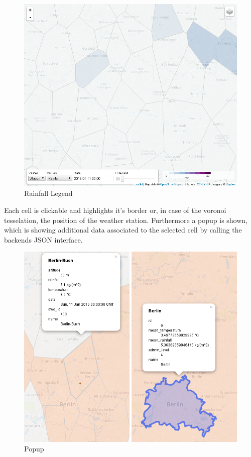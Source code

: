 \begin{figure}[htbp]
\centering
\includegraphics{pictures/screenshot-legend-rain.png}
\caption{Rainfall Legend}
\end{figure}

Each cell is clickable and highlights it's border or, in case of the
voronoi tesselation, the position of the weather station. Furthermore a
popup is shown, which is showing additional data associated to the
selected cell by calling the backends JSON interface.

\begin{figure}[htbp]
\centering
\includegraphics{pictures/screenshot-popup.png}
\caption{Popup}
\end{figure}

